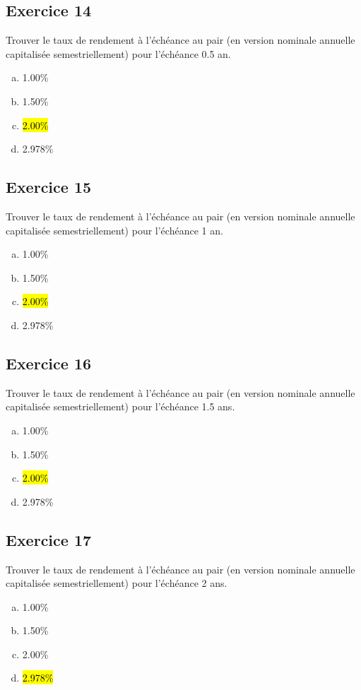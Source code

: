 \documentclass[10pt,a4paper]{article}
\begin{document}
\subsection*{Exercice 14}
Trouver le taux de rendement à l'échéance au pair (en version nominale annuelle capitalisée semestriellement) pour l'échéance 0.5 an.

\begin{enumerate}[a)]
\item 1.00\%
\item 1.50\%
\item  \hl{2.00\%}
\item 2.978\%
\end{enumerate}


\subsection*{Exercice 15}
Trouver le taux de rendement à l'échéance au pair (en version nominale annuelle capitalisée semestriellement) pour l'échéance 1 an.


\begin{enumerate}[a)]
\item 1.00\%
\item 1.50\%
\item  \hl{2.00\%}
\item 2.978\%
\end{enumerate}

\subsection*{Exercice 16}
Trouver le taux de rendement à l'échéance au pair (en version nominale annuelle capitalisée semestriellement) pour l'échéance 1.5 ans.


\begin{enumerate}[a)]
\item 1.00\%
\item 1.50\%
\item  \hl{2.00\%}
\item 2.978\%
\end{enumerate}



\subsection*{Exercice 17}
Trouver le taux de rendement à l'échéance au pair (en version nominale annuelle capitalisée semestriellement) pour l'échéance 2 ans.


\begin{enumerate}[a)]
\item 1.00\%
\item 1.50\%
\item 2.00\%
\item  \hl{2.978\%}
\end{enumerate}
\end{document}
